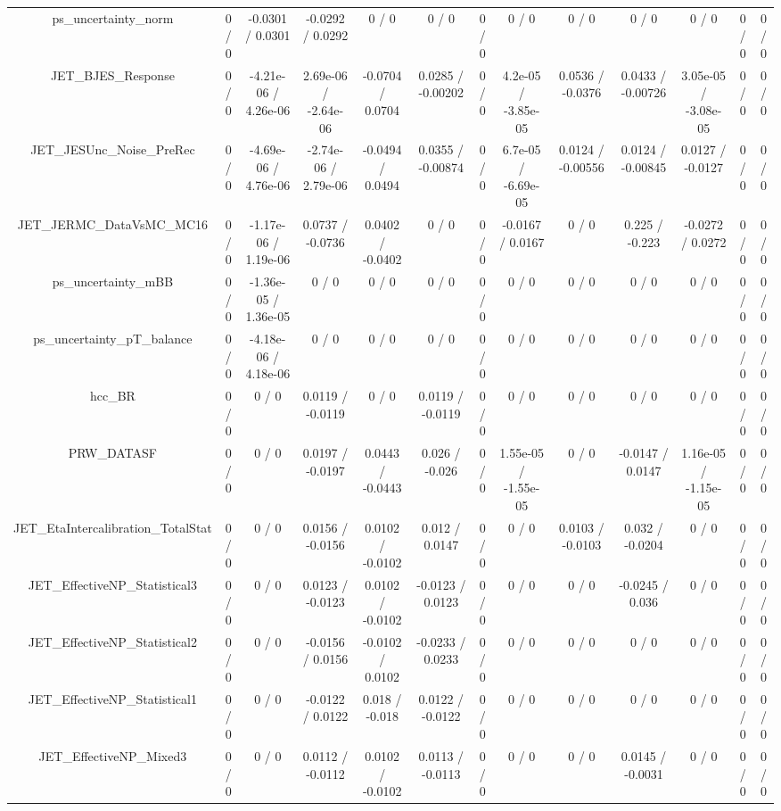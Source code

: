 \documentclass[10pt]{article}
\begin{document}
\begin{table}[htbp]
\begin{center}
\begin{tabular}{|c|c|c|c|c|c|c|c|c|c|c|c|c|}
  ps_uncertainty_norm & 0 / 0 & -0.0301 / 0.0301 & -0.0292 / 0.0292 & 0 / 0 & 0 / 0 & 0 / 0 & 0 / 0 & 0 / 0 & 0 / 0 & 0 / 0 & 0 / 0 & 0 / 0 \\ 
  JET_BJES_Response & 0 / 0 & -4.21e-06 / 4.26e-06 & 2.69e-06 / -2.64e-06 & -0.0704 / 0.0704 & 0.0285 / -0.00202 & 0 / 0 & 4.2e-05 / -3.85e-05 & 0.0536 / -0.0376 & 0.0433 / -0.00726 & 3.05e-05 / -3.08e-05 & 0 / 0 & 0 / 0 \\ 
  JET_JESUnc_Noise_PreRec & 0 / 0 & -4.69e-06 / 4.76e-06 & -2.74e-06 / 2.79e-06 & -0.0494 / 0.0494 & 0.0355 / -0.00874 & 0 / 0 & 6.7e-05 / -6.69e-05 & 0.0124 / -0.00556 & 0.0124 / -0.00845 & 0.0127 / -0.0127 & 0 / 0 & 0 / 0 \\ 
  JET_JERMC_DataVsMC_MC16 & 0 / 0 & -1.17e-06 / 1.19e-06 & 0.0737 / -0.0736 & 0.0402 / -0.0402 & 0 / 0 & 0 / 0 & -0.0167 / 0.0167 & 0 / 0 & 0.225 / -0.223 & -0.0272 / 0.0272 & 0 / 0 & 0 / 0 \\ 
  ps_uncertainty_mBB & 0 / 0 & -1.36e-05 / 1.36e-05 & 0 / 0 & 0 / 0 & 0 / 0 & 0 / 0 & 0 / 0 & 0 / 0 & 0 / 0 & 0 / 0 & 0 / 0 & 0 / 0 \\ 
  ps_uncertainty_pT_balance & 0 / 0 & -4.18e-06 / 4.18e-06 & 0 / 0 & 0 / 0 & 0 / 0 & 0 / 0 & 0 / 0 & 0 / 0 & 0 / 0 & 0 / 0 & 0 / 0 & 0 / 0 \\ 
  hcc_BR & 0 / 0 & 0 / 0 & 0.0119 / -0.0119 & 0 / 0 & 0.0119 / -0.0119 & 0 / 0 & 0 / 0 & 0 / 0 & 0 / 0 & 0 / 0 & 0 / 0 & 0 / 0 \\ 
  PRW_DATASF & 0 / 0 & 0 / 0 & 0.0197 / -0.0197 & 0.0443 / -0.0443 & 0.026 / -0.026 & 0 / 0 & 1.55e-05 / -1.55e-05 & 0 / 0 & -0.0147 / 0.0147 & 1.16e-05 / -1.15e-05 & 0 / 0 & 0 / 0 \\ 
  JET_EtaIntercalibration_TotalStat & 0 / 0 & 0 / 0 & 0.0156 / -0.0156 & 0.0102 / -0.0102 & 0.012 / 0.0147 & 0 / 0 & 0 / 0 & 0.0103 / -0.0103 & 0.032 / -0.0204 & 0 / 0 & 0 / 0 & 0 / 0 \\ 
  JET_EffectiveNP_Statistical3 & 0 / 0 & 0 / 0 & 0.0123 / -0.0123 & 0.0102 / -0.0102 & -0.0123 / 0.0123 & 0 / 0 & 0 / 0 & 0 / 0 & -0.0245 / 0.036 & 0 / 0 & 0 / 0 & 0 / 0 \\ 
  JET_EffectiveNP_Statistical2 & 0 / 0 & 0 / 0 & -0.0156 / 0.0156 & -0.0102 / 0.0102 & -0.0233 / 0.0233 & 0 / 0 & 0 / 0 & 0 / 0 & 0 / 0 & 0 / 0 & 0 / 0 & 0 / 0 \\ 
  JET_EffectiveNP_Statistical1 & 0 / 0 & 0 / 0 & -0.0122 / 0.0122 & 0.018 / -0.018 & 0.0122 / -0.0122 & 0 / 0 & 0 / 0 & 0 / 0 & 0 / 0 & 0 / 0 & 0 / 0 & 0 / 0 \\ 
  JET_EffectiveNP_Mixed3 & 0 / 0 & 0 / 0 & 0.0112 / -0.0112 & 0.0102 / -0.0102 & 0.0113 / -0.0113 & 0 / 0 & 0 / 0 & 0 / 0 & 0.0145 / -0.0031 & 0 / 0 & 0 / 0 & 0 / 0 \\ 

\end{tabular}
\end{center}
\end{table}
\end{document}
